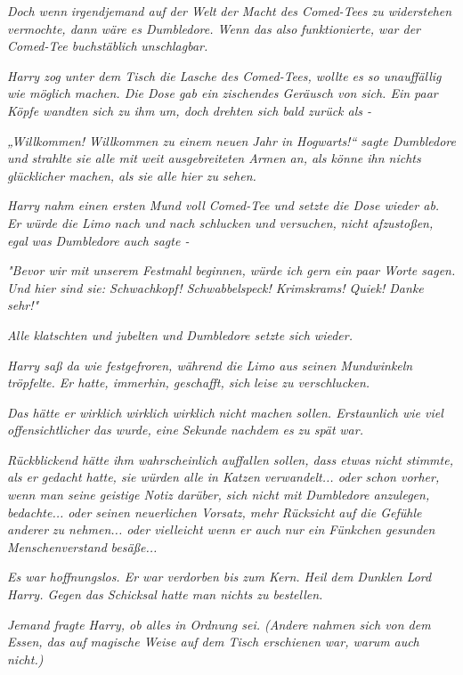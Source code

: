 {\emph{Doch wenn} \emph{\emph{irgendjemand auf der Welt}} \emph{der Macht des Comed-Tees zu widerstehen vermochte, dann wäre es Dumbledore. Wenn das also} \emph{funktionierte, war der Comed-Tee buchstäblich} \emph{\emph{unschlagbar.}}

\emph{Harry zog unter dem Tisch die Lasche des Comed-Tees, wollte es so unauffällig wie möglich machen. Die Dose gab ein zischendes Geräusch von sich. Ein paar Köpfe wandten sich zu ihm um, doch drehten sich bald zurück als -}

\emph{„Willkommen! Willkommen zu einem neuen Jahr in Hogwarts!“ sagte Dumbledore und strahlte sie alle mit weit ausgebreiteten Armen an, als könne ihn nichts glücklicher machen, als sie alle hier zu sehen.}

\emph{Harry nahm einen ersten Mund voll Comed-Tee und setzte die Dose wieder ab. Er würde die Limo nach und nach schlucken und versuchen,} \emph{nicht afzustoßen, egal} \emph{\emph{was}} \emph{Dumbledore auch sagte -}

\emph{"Bevor wir mit unserem Festmahl beginnen, würde ich gern ein paar Worte sagen. Und hier sind sie: Schwachkopf! Schwabbelspeck! Krimskrams! Quiek! Danke sehr!"}

\emph{Alle klatschten und jubelten und Dumbledore setzte sich wieder.}

\emph{Harry saß da wie festgefroren, während die Limo aus seinen Mundwinkeln tröpfelte. Er hatte, immerhin, geschafft, sich} \emph{\emph{leise}} \emph{zu verschlucken.}

\emph{Das hätte er wirklich wirklich} \emph{\emph{wirklich}} \emph{nicht machen sollen. Erstaunlich wie viel} \emph{\emph{offensichtlicher}} \emph{das wurde, eine} \emph{\emph{Sekunde}} \emph{nachdem es} \emph{\emph{zu spät}} \emph{war.}

\emph{Rückblickend hätte ihm wahrscheinlich auffallen sollen, dass etwas nicht stimmte, als er gedacht hatte, sie würden alle in Katzen verwandelt... oder schon vorher, wenn man seine geistige Notiz darüber, sich nicht mit Dumbledore anzulegen, bedachte... oder seinen neuerlichen Vorsatz, mehr Rücksicht auf die Gefühle anderer} \emph{zu nehmen... oder vielleicht wenn er auch nur} \emph{\emph{ein Fünkchen gesunden Menschenverstand}} \emph{besäße...}

\emph{Es war hoffnungslos. Er war verdorben bis zum Kern. Heil dem Dunklen Lord Harry. Gegen das Schicksal} \emph{hatte man nichts zu bestellen.}

\emph{Jemand fragte Harry, ob alles in Ordnung sei. (Andere nahmen sich von dem Essen, das auf magische Weise auf dem Tisch erschienen war, warum} \emph{auch} \emph{nicht.)}

}
